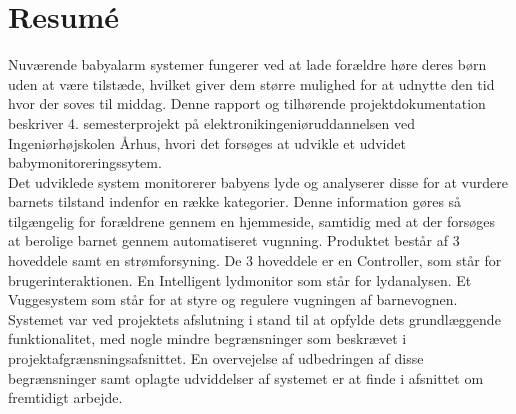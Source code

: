\chapter{Resumé}

Nuværende babyalarm systemer fungerer ved at lade forældre høre deres børn uden at være tilstæde, hvilket giver dem større mulighed for at udnytte den tid hvor der soves til middag.
Denne rapport og tilhørende projektdokumentation beskriver 4. semesterprojekt på elektronikingeniøruddannelsen ved Ingeniørhøjskolen Århus, hvori det forsøges at udvikle et udvidet babymonitoreringssytem.\\
Det udviklede system monitorerer babyens lyde og analyserer disse for at vurdere barnets tilstand indenfor en række kategorier. Denne information gøres så tilgængelig for forældrene gennem en hjemmeside, samtidig med at der forsøges at berolige barnet gennem automatiseret vugnning.
Produktet består af 3 hoveddele samt en strømforsyning. De 3 hoveddele er en Controller, som står for brugerinteraktionen. En Intelligent lydmonitor som står for lydanalysen. Et Vuggesystem som står for at styre og regulere vugningen af barnevognen. \\
Systemet var ved projektets afslutning i stand til at opfylde dets grundlæggende funktionalitet, med nogle mindre begrænsninger som beskrævet i projektafgrænsningsafsnittet. En overvejelse af udbedringen af disse begrænsninger samt oplagte udviddelser af systemet er at finde i afsnittet om fremtidigt arbejde.\\

%
%
%

